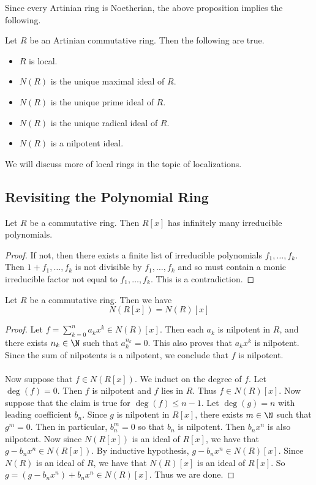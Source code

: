 \documentclass[a4paper]{article}
\begin{document}
Since every Artinian ring is Noetherian, the above proposition implies the following. 

\begin{crl}{}{} Let $R$ be an Artinian commutative ring. Then the following are true. 
\begin{itemize}
\item $R$ is local. 
\item $N(R)$ is the unique maximal ideal of $R$. 
\item $N(R)$ is the unique prime ideal of $R$. 
\item $N(R)$ is the unique radical ideal of $R$. 
\item $N(R)$ is a nilpotent ideal. 
\end{itemize}
\end{crl}

We will discuss more of local rings in the topic of localizations. 

\subsection{Revisiting the Polynomial Ring}
\begin{lmm}{}{} Let $R$ be a commutative ring. Then $R[x]$ has infinitely many irreducible polynomials. \tcbline
\begin{proof}
If not, then there exists a finite list of irreducible polynomials $f_1,\dots,f_k$. Then $1+f_1,\dots,f_k$ is not divisible by $f_1,\dots,f_k$ and so must contain a monic irreducible factor not equal to $f_1,\dots,f_k$. This is a contradiction. 
\end{proof}
\end{lmm}

\begin{prp}{}{} Let $R$ be a commutative ring. Then we have $$N(R[x])=N(R)[x]$$ \tcbline
\begin{proof}
Let $f=\sum_{k=0}^na_kx^k\in N(R)[x]$. Then each $a_k$ is nilpotent in $R$, and there exists $n_k\in\N$ such that $a_k^{n_k}=0$. This also proves that $a_kx^k$ is nilpotent. Since the sum of nilpotents is a nilpotent, we conclude that $f$ is nilpotent. \\~\\

Now suppose that $f\in N(R[x])$. We induct on the degree of $f$. Let $\deg(f)=0$. Then $f$ is nilpotent and $f$ lies in $R$. Thus $f\in N(R)[x]$. Now suppose that the claim is true for $\deg(f)\leq n-1$. Let $\deg(g)=n$ with leading coefficient $b_n$. Since $g$ is nilpotent in $R[x]$, there exists $m\in\N$ such that $g^m=0$. Then in particular, $b_n^m=0$ so that $b_n$ is nilpotent. Then $b_nx^n$ is also nilpotent. Now since $N(R[x])$ is an ideal of $R[x]$, we have that $g-b_nx^n\in N(R[x])$. By inductive hypothesis, $g-b_nx^n\in N(R)[x]$. Since $N(R)$ is an ideal of $R$, we have that $N(R)[x]$ is an ideal of $R[x]$. So $g=(g-b_nx^n)+b_nx^n\in N(R)[x]$. Thus we are done. 
\end{proof}
\end{prp}
\end{document}
